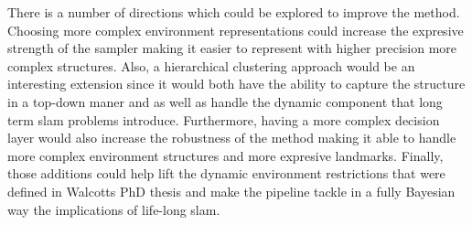 \documentclass[]{article}
\begin{document}
    There is a number of directions which could be explored to improve the method. Choosing more complex environment representations could increase the expresive strength of the sampler making it easier to represent with higher precision more complex structures. Also, a hierarchical clustering approach would be an interesting extension since it would both have the ability to capture the structure in a top-down maner and as well as handle the dynamic component that long term slam problems introduce. Furthermore, having a more complex decision layer would also increase the robustness of the method making it able to handle more complex environment structures and more expresive landmarks. Finally, those additions could help lift the dynamic environment restrictions that were defined in Walcotts PhD thesis and make the pipeline tackle in a fully Bayesian way the implications of life-long slam.

\end{document}
